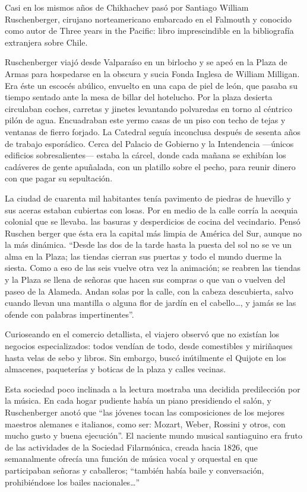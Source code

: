 \documentclass[10pt,twoside,openright]{memoir}
\begin{document}
Casi en los mismos años de Chikhachev pasó por Santiago William
Ruschenberger, cirujano norteamericano embarcado en el Falmouth y
conocido como autor de Three years in the Pacific: libro imprescindible
en la bibliografía extranjera sobre Chile.

Ruschenberger viajó desde Valparaíso en un birlocho y se apeó en la
Plaza de Armas para hospedarse en la obscura y sucia Fonda Inglesa de
William Milligan. Era éste un escocés abúlico, envuelto en una capa de
piel de león, que pasaba su tiempo sentado ante la mesa de billar del
hotelucho. Por la plaza desierta circulaban coches, carretas y jinetes
levantando polvaredas en torno al céntrico pilón de agua. Encuadraban
este yermo casas de un piso con techo de tejas y ventanas de fierro
forjado. La Catedral seguía inconclusa después de sesenta años de
trabajo esporádico. Cerca del Palacio de Gobierno y la Intendencia
---únicos edificios sobresalientes--- estaba la cárcel, donde cada
mañana se exhibían los cadáveres de gente apuñalada, con un platillo
sobre el pecho, para reunir dinero con que pagar su sepultación.

La ciudad de cuarenta mil habitantes tenía pavimento de piedras de
huevillo y sus aceras estaban cubiertas con losas. Por en medio de la
calle corría la acequia colonial que se llevaba. las basuras y
desperdicios de cocina del vecindario. Pensó Ruschen berger que ésta era
la capital más limpia de América del Sur, aunque no la más dinámica.
``Desde las dos de la tarde hasta la puesta del sol no se ve un alma en
la Plaza; las tiendas cierran sus puertas y todo el mundo duerme la
siesta. Como a eso de las seis vuelve otra vez la animación; se reabren
las tiendas y la Plaza se llena de señoras que hacen sus compras o que
van o vuelven del paseo de la Alameda. Andan solas por la calle, con la
cabeza descubierta, salvo cuando llevan una mantilla o alguna flor de
jardín en el cabello\ldots, y jamás se las ofende con palabras
impertinentes''.

Curioseando en el comercio detallista, el viajero observó que no
existían los negocios especializados: todos vendían de todo, desde
comestibles y miriñaques hasta velas de sebo y libros. Sin embargo,
buscó inútilmente el Quijote en los almacenes, paqueterías y boticas de
la plaza y calles vecinas.

Esta sociedad poco inclinada a la lectura mostraba una decidida
predilección por la música. En cada hogar pudiente había un piano
presidiendo el salón, y Ruschenberger anotó que ``las jóvenes tocan las
composiciones de los mejores maestros alemanes e italianos, como ser:
Mozart, Weber, Rossini y otros, con mucho gusto y buena ejecución''. El
naciente mundo musical santiaguino era fruto de las actividades de la
Sociedad Filarmónica, creada hacia 1826, que semanalmente ofrecía una
función de música vocal y orquestal en que participaban señoras y
caballeros; ``también había baile y conversación, prohibiéndose los
bailes nacionales\ldots''
\end{document}

